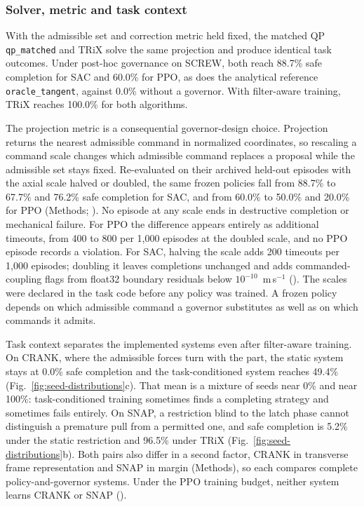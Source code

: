 \documentclass[12pt]{article}
\begin{document}
\subsubsection{Solver, metric and task context}
\label{sec:context-results}
With the admissible set and correction metric held fixed, the matched QP \texttt{qp\_matched} and TRiX solve the same projection and produce identical task outcomes. Under post-hoc governance on SCREW, both reach 88.7\% safe completion for SAC and 60.0\% for PPO, as does the analytical reference \texttt{oracle\_tangent}, against 0.0\% without a governor. With filter-aware training, TRiX reaches 100.0\% for both algorithms.

The projection metric is a consequential governor-design choice. Projection returns the
nearest admissible command in normalized coordinates, so rescaling a command
scale changes which admissible command replaces a proposal while the admissible
set stays fixed. Re-evaluated on their archived held-out
episodes with the axial scale halved or doubled, the same frozen policies fall
from 88.7\% to 67.7\% and 76.2\% safe completion for SAC, and from 60.0\% to
50.0\% and 20.0\% for PPO (Methods; ). No episode at any scale ends in
destructive completion or mechanical failure. For PPO the difference appears
entirely as additional timeouts, from 400 to 800 per 1,000 episodes at the doubled
scale, and no PPO episode records a violation. For SAC, halving the scale adds 200
timeouts per 1,000 episodes; doubling it leaves completions unchanged and adds
commanded-coupling flags from float32 boundary residuals below
$10^{-10}$~m\,s$^{-1}$ ().
The scales were declared in the task code before any policy was trained. A
frozen policy depends on which admissible command a governor substitutes as
well as on which commands it admits.

Task context separates the implemented systems even after filter-aware
training. On CRANK, where the admissible forces turn with the part, the static
system stays at 0.0\% safe completion and the task-conditioned system reaches
49.4\% (Fig.~\ref{fig:seed-distributions}c). That mean is a mixture of seeds
near 0\% and near 100\%: task-conditioned training sometimes finds a completing
strategy and sometimes fails entirely. On SNAP, a restriction blind to the
latch phase cannot distinguish a premature pull from a permitted one, and safe
completion is 5.2\% under the static restriction and 96.5\% under TRiX
(Fig.~\ref{fig:seed-distributions}b). Both pairs also differ in a second
factor, CRANK in transverse frame representation and SNAP in margin (Methods),
so each compares complete policy-and-governor systems. Under the PPO training budget, neither system learns CRANK or SNAP ().
\end{document}
